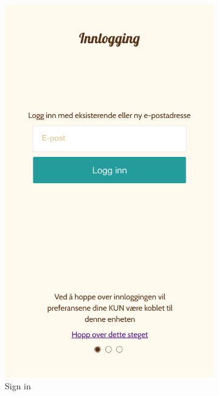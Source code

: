 \begin{appendices}
\begin{figure}[h]
	\end{figure}
	\begin{figure}
		\ContinuedFloat
		\centering
		\begin{subfigure}[h]{0.3\textwidth}
			\includegraphics[width=\textwidth]{fig/screenshot_login}
			\caption{Sign in}
		\end{subfigure}
		\begin{subfigure}[h]{0.3\textwidth}

\end{subfigure}
\end{figure}
\end{appendices}
